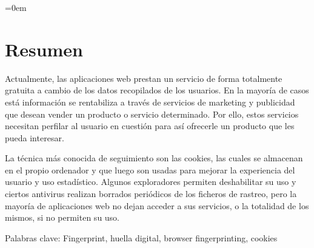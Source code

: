 \parindent=0em
\chapter{Resumen}
\noindent
Actualmente, las aplicaciones web prestan un servicio de forma totalmente gratuita a cambio de los datos recopilados de los usuarios. En la mayoría de casos está información se rentabiliza a través de servicios de marketing y publicidad que desean vender un producto o servicio determinado. Por ello, estos servicios necesitan perfilar al usuario en cuestión para así ofrecerle un producto que les pueda interesar.\par
La técnica más conocida de seguimiento son las cookies, las cuales se almacenan en el propio ordenador y que luego son usadas para mejorar la experiencia del usuario y uso estadístico.
Algunos exploradores permiten deshabilitar su uso y ciertos antivirus realizan borrados periódicos de los ficheros de rastreo, pero la mayoría de aplicaciones web no dejan acceder a sus servicios, o la totalidad de los mismos, si no permiten su uso.\par
\vspace{12mm}
Palabras clave: Fingerprint, huella digital, browser fingerprinting, cookies


















